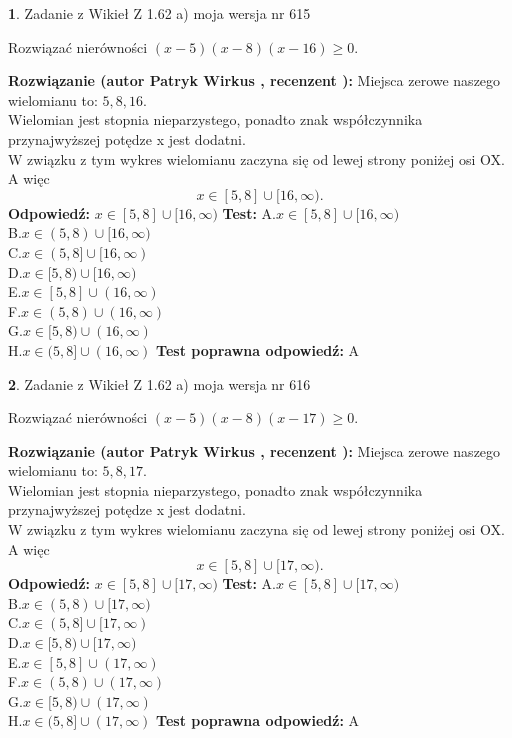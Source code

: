 \documentclass[12pt, a4paper]{article}
\theoremstyle{definition} %
\newtheorem{zad}{}
\newcommand{\zadStart}[1]{\begin{zad}#1\newline}
\newcommand{\zadStop}{\end{zad}}
\newcommand{\rozwStart}[2]{\noindent \textbf{Rozwiązanie (autor #1 , recenzent #2): }\newline}
\newcommand{\rozwStop}{\newline}
\newcommand{\odpStart}{\noindent \textbf{Odpowiedź:}\newline}
\newcommand{\odpStop}{\newline}
\newcommand{\testStart}{\noindent \textbf{Test:}\newline}
\newcommand{\testStop}{\newline}
\newcommand{\kluczStart}{\noindent \textbf{Test poprawna odpowiedź:}\newline}
\newcommand{\kluczStop}{\newline}
\begin{document}
\zadStart{Zadanie z Wikieł Z 1.62 a) moja wersja nr 615}

Rozwiązać nierówności $(x-5)(x-8)(x-16)\ge0$.
\zadStop
\rozwStart{Patryk Wirkus}{}
Miejsca zerowe naszego wielomianu to: $5, 8, 16$.\\
Wielomian jest stopnia nieparzystego, ponadto znak współczynnika przy\linebreak najwyższej potędze x jest dodatni.\\ W związku z tym wykres wielomianu zaczyna się od lewej strony poniżej osi OX. A więc $$x \in [5,8] \cup [16,\infty).$$
\rozwStop
\odpStart
$x \in [5,8] \cup [16,\infty)$
\odpStop
\testStart
A.$x \in [5,8] \cup [16,\infty)$\\
B.$x \in (5,8) \cup [16,\infty)$\\
C.$x \in (5,8] \cup [16,\infty)$\\
D.$x \in [5,8) \cup [16,\infty)$\\
E.$x \in [5,8] \cup (16,\infty)$\\
F.$x \in (5,8) \cup (16,\infty)$\\
G.$x \in [5,8) \cup (16,\infty)$\\
H.$x \in (5,8] \cup (16,\infty)$
\testStop
\kluczStart
A
\kluczStop



\zadStart{Zadanie z Wikieł Z 1.62 a) moja wersja nr 616}

Rozwiązać nierówności $(x-5)(x-8)(x-17)\ge0$.
\zadStop
\rozwStart{Patryk Wirkus}{}
Miejsca zerowe naszego wielomianu to: $5, 8, 17$.\\
Wielomian jest stopnia nieparzystego, ponadto znak współczynnika przy\linebreak najwyższej potędze x jest dodatni.\\ W związku z tym wykres wielomianu zaczyna się od lewej strony poniżej osi OX. A więc $$x \in [5,8] \cup [17,\infty).$$
\rozwStop
\odpStart
$x \in [5,8] \cup [17,\infty)$
\odpStop
\testStart
A.$x \in [5,8] \cup [17,\infty)$\\
B.$x \in (5,8) \cup [17,\infty)$\\
C.$x \in (5,8] \cup [17,\infty)$\\
D.$x \in [5,8) \cup [17,\infty)$\\
E.$x \in [5,8] \cup (17,\infty)$\\
F.$x \in (5,8) \cup (17,\infty)$\\
G.$x \in [5,8) \cup (17,\infty)$\\
H.$x \in (5,8] \cup (17,\infty)$
\testStop
\kluczStart
A
\kluczStop
\end{document}
